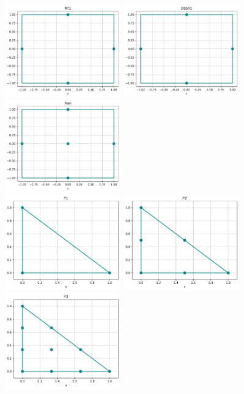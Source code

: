 \begin{center}
\includegraphics[width=5cm]{python_codes/fieldstone_120/spaces/RT1_nodes}
\includegraphics[width=5cm]{python_codes/fieldstone_120/spaces/DSSY1_nodes}
\includegraphics[width=5cm]{python_codes/fieldstone_120/spaces/Han_nodes}\\
\includegraphics[width=5cm]{python_codes/fieldstone_120/spaces/P1_nodes}
\includegraphics[width=5cm]{python_codes/fieldstone_120/spaces/P2_nodes}
\includegraphics[width=5cm]{python_codes/fieldstone_120/spaces/P3_nodes}\\

\end{center}
